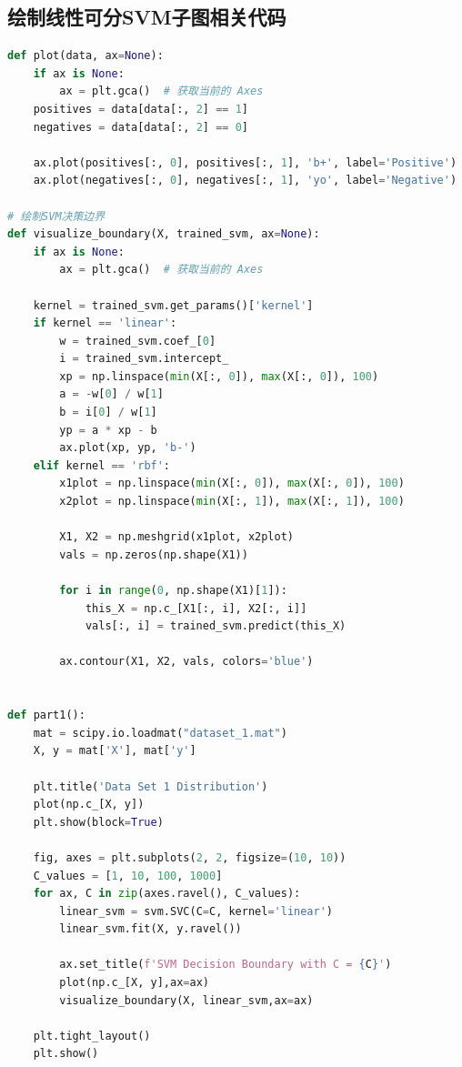 \documentclass{SEU-AI-Report}
\begin{document}
\subsection{绘制线性可分SVM子图相关代码}\label{sec:subfloat}
\begin{lstlisting}[style=pythonstyle,language=python,caption= 新版part1函数以及相关改动]
def plot(data, ax=None):
    if ax is None:
        ax = plt.gca()  # 获取当前的 Axes
    positives = data[data[:, 2] == 1]
    negatives = data[data[:, 2] == 0]

    ax.plot(positives[:, 0], positives[:, 1], 'b+', label='Positive')
    ax.plot(negatives[:, 0], negatives[:, 1], 'yo', label='Negative')

# 绘制SVM决策边界
def visualize_boundary(X, trained_svm, ax=None):
    if ax is None:
        ax = plt.gca()  # 获取当前的 Axes

    kernel = trained_svm.get_params()['kernel']
    if kernel == 'linear':
        w = trained_svm.coef_[0]
        i = trained_svm.intercept_
        xp = np.linspace(min(X[:, 0]), max(X[:, 0]), 100)
        a = -w[0] / w[1]
        b = i[0] / w[1]
        yp = a * xp - b
        ax.plot(xp, yp, 'b-')
    elif kernel == 'rbf':
        x1plot = np.linspace(min(X[:, 0]), max(X[:, 0]), 100)
        x2plot = np.linspace(min(X[:, 1]), max(X[:, 1]), 100)
        
        X1, X2 = np.meshgrid(x1plot, x2plot)
        vals = np.zeros(np.shape(X1))
        
        for i in range(0, np.shape(X1)[1]):
            this_X = np.c_[X1[:, i], X2[:, i]]
            vals[:, i] = trained_svm.predict(this_X)
        
        ax.contour(X1, X2, vals, colors='blue')


def part1():
	mat = scipy.io.loadmat("dataset_1.mat")
	X, y = mat['X'], mat['y']
    
	plt.title('Data Set 1 Distribution')
	plot(np.c_[X, y])
	plt.show(block=True)
    
	fig, axes = plt.subplots(2, 2, figsize=(10, 10)) 
	C_values = [1, 10, 100, 1000]
	for ax, C in zip(axes.ravel(), C_values):
		linear_svm = svm.SVC(C=C, kernel='linear')
		linear_svm.fit(X, y.ravel())

		ax.set_title(f'SVM Decision Boundary with C = {C}')
		plot(np.c_[X, y],ax=ax)
		visualize_boundary(X, linear_svm,ax=ax)     

	plt.tight_layout()  
	plt.show()
\end{lstlisting}
\end{document}
